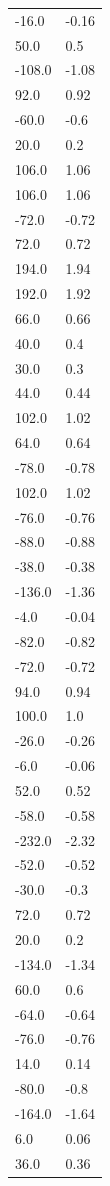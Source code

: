 \begin{longtable}{ll}
-16.0 & -0.16 \\
50.0 & 0.5 \\
-108.0 & -1.08 \\
92.0 & 0.92 \\
-60.0 & -0.6 \\
20.0 & 0.2 \\
106.0 & 1.06 \\
106.0 & 1.06 \\
-72.0 & -0.72 \\
72.0 & 0.72 \\
194.0 & 1.94 \\
192.0 & 1.92 \\
66.0 & 0.66 \\
40.0 & 0.4 \\
30.0 & 0.3 \\
44.0 & 0.44 \\
102.0 & 1.02 \\
64.0 & 0.64 \\
-78.0 & -0.78 \\
102.0 & 1.02 \\
-76.0 & -0.76 \\
-88.0 & -0.88 \\
-38.0 & -0.38 \\
-136.0 & -1.36 \\
-4.0 & -0.04 \\
-82.0 & -0.82 \\
-72.0 & -0.72 \\
94.0 & 0.94 \\
100.0 & 1.0 \\
-26.0 & -0.26 \\
-6.0 & -0.06 \\
52.0 & 0.52 \\
-58.0 & -0.58 \\
-232.0 & -2.32 \\
-52.0 & -0.52 \\
-30.0 & -0.3 \\
72.0 & 0.72 \\
20.0 & 0.2 \\
-134.0 & -1.34 \\
60.0 & 0.6 \\
-64.0 & -0.64 \\
-76.0 & -0.76 \\
14.0 & 0.14 \\
-80.0 & -0.8 \\
-164.0 & -1.64 \\
6.0 & 0.06 \\
36.0 & 0.36 \\

\end{longtable}
